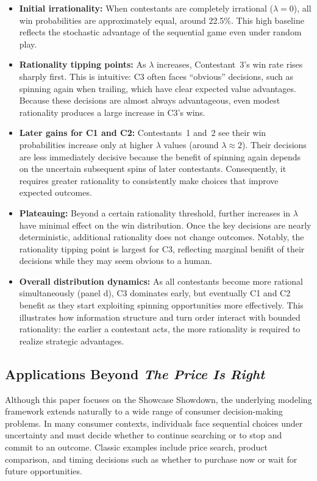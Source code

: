 \documentclass[titlepage,12pt]{article}
\begin{document}
\begin{itemize}
    \item \textbf{Initial irrationality:} When contestants are completely irrational ($\lambda = 0$), all win probabilities are approximately equal, around 22.5\%. This high baseline reflects the stochastic advantage of the sequential game even under random play.
    \item \textbf{Rationality tipping points:} As $\lambda$ increases, Contestant~3’s win rate rises sharply first. This is intuitive: C3 often faces “obvious” decisions, such as spinning again when trailing, which have clear expected value advantages. Because these decisions are almost always advantageous, even modest rationality produces a large increase in C3’s wins.
    \item \textbf{Later gains for C1 and C2:} Contestants~1 and~2 see their win probabilities increase only at higher $\lambda$ values (around $\lambda \approx 2$). Their decisions are less immediately decisive because the benefit of spinning again depends on the uncertain subsequent spins of later contestants. Consequently, it requires greater rationality to consistently make choices that improve expected outcomes.
    \item \textbf{Plateauing:} Beyond a certain rationality threshold, further increases in $\lambda$ have minimal effect on the win distribution. Once the key decisions are nearly deterministic, additional rationality does not change outcomes. Notably, the rationality tipping point is largest for C3, reflecting marginal benifit of their decisions while they may seem obvious to a human.
    \item \textbf{Overall distribution dynamics:} As all contestants become more rational simultaneously (panel d), C3 dominates early, but eventually C1 and C2 benefit as they start exploiting spinning opportunities more effectively. This illustrates how information structure and turn order interact with bounded rationality: the earlier a contestant acts, the more rationality is required to realize strategic advantages.
\end{itemize}

\subsection{Applications Beyond \textit{The Price Is Right}}

Although this paper focuses on the Showcase Showdown, the underlying modeling framework extends naturally to a wide range of consumer decision-making problems. In many consumer contexts, individuals face sequential choices under uncertainty and must decide whether to continue searching or to stop and commit to an outcome. Classic examples include price search, product comparison, and timing decisions such as whether to purchase now or wait for future opportunities.
\end{document}
